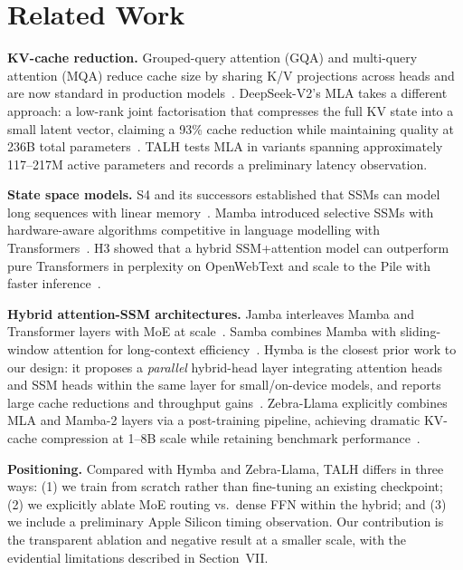\documentclass[conference]{IEEEtran}
\begin{document}
\section{Related Work}

\textbf{KV-cache reduction.} Grouped-query attention (GQA) and multi-query
attention (MQA) reduce cache size by sharing K/V projections across heads and
are now standard in production models~\cite{gqa2023}. DeepSeek-V2's MLA
takes a different approach: a low-rank joint factorisation that compresses the
full KV state into a small latent vector, claiming a 93\% cache reduction while
maintaining quality at 236B total parameters~\cite{deepseekv2}. TALH tests MLA
in variants spanning approximately 117--217M active parameters and records a
preliminary latency observation.

\textbf{State space models.} S4 and its successors established that SSMs can
model long sequences with linear memory~\cite{mamba2023,h3_2022}. Mamba
introduced selective SSMs with hardware-aware algorithms competitive in
language modelling with Transformers~\cite{mamba2023}. H3 showed that a
hybrid SSM+attention model can outperform pure Transformers in perplexity on
OpenWebText and scale to the Pile with faster inference~\cite{h3_2022}.

\textbf{Hybrid attention-SSM architectures.} Jamba interleaves Mamba and
Transformer layers with MoE at scale~\cite{jamba2024}. Samba combines Mamba
with sliding-window attention for long-context efficiency~\cite{samba2024}.
Hymba is the closest prior work to our design: it proposes a \emph{parallel}
hybrid-head layer integrating attention heads and SSM heads within the same
layer for small/on-device models, and reports large cache reductions and
throughput gains~\cite{hymba2024}. Zebra-Llama explicitly combines MLA and
Mamba-2 layers via a post-training pipeline, achieving dramatic KV-cache
compression at 1--8B scale while retaining benchmark performance~\cite{zebra2025}.

\textbf{Positioning.} Compared with Hymba and Zebra-Llama, TALH differs in
three ways: (1) we train from scratch rather than fine-tuning an existing
checkpoint; (2) we explicitly ablate MoE routing vs.\ dense FFN within the
hybrid; and (3) we include a preliminary Apple Silicon timing observation. Our
contribution is the transparent ablation and negative result at a smaller scale,
with the evidential limitations described in Section~VII.
\end{document}
